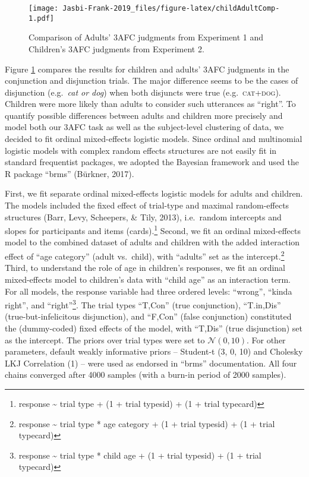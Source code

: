 \documentclass[
  english,
  ,man,floatsintext]{apa6}
\begin{document}
\begin{figure}
\centering
\texttt{[image: Jasbi-Frank-2019\_files/figure-latex/childAdultComp-1.pdf]}
\caption{\label{fig:childAdultComp}Comparison of Adults' 3AFC judgments from Experiment 1 and Children's 3AFC judgments from Experiment 2.}
\end{figure}

Figure \ref{fig:childAdultComp} compares the results for children and adults' 3AFC judgments in the conjunction and disjunction trials. The major difference seems to be the cases of disjunction (e.g.~\emph{cat or dog}) when both disjuncts were true (e.g.~\textsc{cat+dog}). Children were more likely than adults to consider such utterances as \enquote{right}. To quantify possible differences between adults and children more precisely and model both our 3AFC task as well as the subject-level clustering of data, we decided to fit ordinal mixed-effects logistic models. Since ordinal and multinomial logistic models with complex random effects structures are not easily fit in standard frequentist packages, we adopted the Bayesian framework and used the R package \enquote{brms} (Bürkner, 2017).

First, we fit separate ordinal mixed-effects logistic models for adults and children. The models included the fixed effect of trial-type and maximal random-effects structures (Barr, Levy, Scheepers, \& Tily, 2013), i.e.~random intercepts and slopes for participants and items (cards).\footnote{response \textasciitilde{} trial type + (1 + trial type\textbar sid) + (1 + trial type\textbar card)} Second, we fit an ordinal mixed-effects model to the combined dataset of adults and children with the added interaction effect of \enquote{age category} (adult vs.~child), with \enquote{adults} set as the intercept.\footnote{response \textasciitilde{} trial type * age category + (1 + trial type\textbar sid) + (1 + trial type\textbar card)} Third, to understand the role of age in children's responses, we fit an ordinal mixed-effects model to children's data with \enquote{child age} as an interaction term. For all models, the response variable had three ordered levels: \enquote{wrong}, \enquote{kinda right}, and \enquote{right}\footnote{response \textasciitilde{} trial type * child age + (1 + trial type\textbar sid) + (1 + trial type\textbar card)}. The trial types \enquote{T,Con} (true conjunction), \enquote{T.in,Dis} (true-but-infelicitous disjunction), and \enquote{F,Con} (false conjunction) constituted the (dummy-coded) fixed effects of the model, with \enquote{T,Dis} (true disjunction) set as the intercept. The priors over trial types were set to \(\mathcal{N}(0,10)\). For other parameters, default weakly informative priors -- Student-t (3, 0, 10) and Cholesky LKJ Correlation (1) -- were used as endorsed in \enquote{brms} documentation. All four chains converged after 4000 samples (with a burn-in period of 2000 samples).
\end{document}
